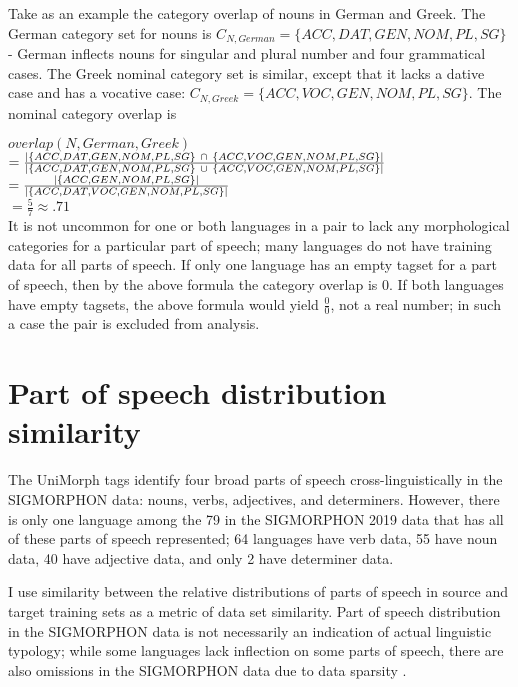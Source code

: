 Take as an example the category overlap of nouns in German and Greek. The German category set for nouns is $C_{N,German} = \{ACC, DAT, GEN, NOM, PL, SG\}$ - German inflects nouns for singular and plural number and four grammatical cases. The Greek nominal category set is similar, except that it lacks a dative case and has a vocative case: $C_{N,Greek} = \{ACC, VOC, GEN, NOM, PL, SG\}$. The nominal category overlap is 

$overlap(N, German, Greek)$\\
$= \frac{\abs*{\{ACC, DAT, GEN, NOM, PL, SG\}\ \cap\ \{ACC, VOC, GEN, NOM, PL, SG\}}}{\abs*{\{ACC, DAT, GEN, NOM, PL, SG\}\ \cup\ \{ACC, VOC, GEN, NOM, PL, SG\}}}$\\
$= \frac{\abs*{\{ACC, GEN, NOM, PL, SG\}}}{\abs*{\{ACC, DAT, VOC, GEN, NOM, PL, SG\}}}$\\
$= \frac{5}{7} \approx .71$\\

It is not uncommon for one or both languages in a pair to lack any morphological categories for a particular part of speech; many languages do not have training data for all parts of speech. If only one language has an empty tagset for a part of speech, then by the above formula the category overlap is 0. If both languages have empty tagsets, the above formula would yield $\frac{0}{0}$, not a real number; in such a case the pair is excluded from analysis.

\section{Part of speech distribution similarity}
\label{sec:POSDS}

The UniMorph tags identify four broad parts of speech cross-linguistically in the SIGMORPHON data: nouns, verbs, adjectives, and determiners. However, there is only one language among the 79 in the SIGMORPHON 2019 data that has all of these parts of speech represented; 64 languages have verb data, 55 have noun data, 40 have adjective data, and only 2 have determiner data. 

I use similarity between the relative distributions of parts of speech in source and target training sets as a metric of data set similarity. Part of speech distribution in the SIGMORPHON data is not necessarily an indication of actual linguistic typology; while some languages lack inflection on some parts of speech, there are also omissions in the SIGMORPHON data due to data sparsity \parencite{Cotterell2018b}.


